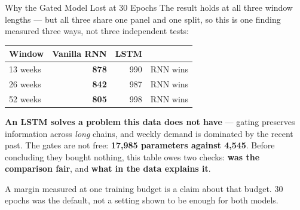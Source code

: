 \documentclass[aspectratio=169, 11pt]{beamer}
\begin{document}
\begin{frame}{Why the Gated Model Lost at 30 Epochs}
  The result holds at all three window lengths --- but all three share one panel and one split,
  so this is one finding measured three ways, not three independent tests:
  \begin{center}
    {\small
    \begin{tabular}{lrrl}
      \toprule
      \textbf{Window} & \textbf{Vanilla RNN} & \textbf{LSTM} & \\
      \midrule
      13 weeks & \textbf{878} & 990 & RNN wins \\
      26 weeks & \textbf{842} & 987 & RNN wins \\
      52 weeks & \textbf{805} & 998 & RNN wins \\
      \bottomrule
    \end{tabular}
    }
  \end{center}

  \vspace{-0.3cm}
  \textbf{An LSTM solves a problem this data does not have} --- gating preserves information
  across \emph{long} chains, and weekly demand is dominated by the recent past. The gates are not
  free: \textbf{17{,}985 parameters against 4{,}545}. Before concluding they bought nothing,
  this table owes two checks: \textbf{was the comparison fair}, and \textbf{what in the data
  explains it}.

  \begin{warningbox}
    A margin measured at one training budget is a claim about that budget. 30 epochs was the
    default, not a setting shown to be enough for both models.
  \end{warningbox}
\end{frame}
\end{document}
